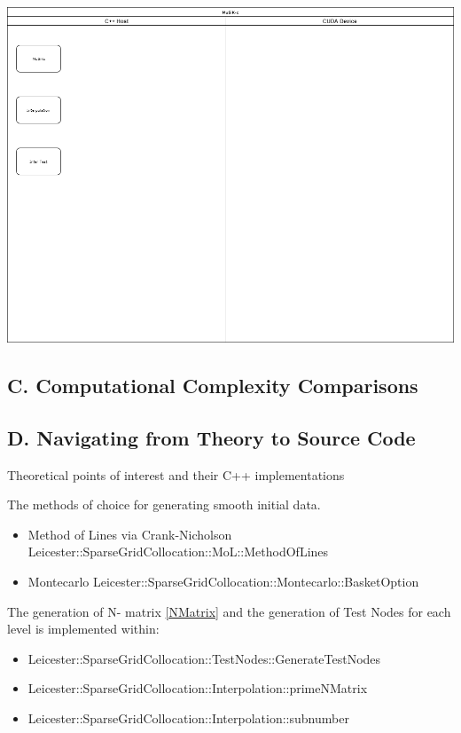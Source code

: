 \documentclass[a4paper]{amsart}
\begin{document}
\includegraphics[scale=0.3]{MuSiKc1.png}

\subsection{C. Computational Complexity Comparisons}


\subsection{D. Navigating from Theory to Source Code}
Theoretical points of interest and their C++ implementations

The methods of choice for generating smooth initial data.
\begin{itemize}
\item Method of Lines via Crank-Nicholson Leicester::SparseGridCollocation::MoL::MethodOfLines
\item Montecarlo Leicester::SparseGridCollocation::Montecarlo::BasketOption
\end{itemize}

The generation of N- matrix \ref{NMatrix} and the generation of Test Nodes for each level is implemented within:
\begin{itemize}
\item Leicester::SparseGridCollocation::TestNodes::GenerateTestNodes
\item Leicester::SparseGridCollocation::Interpolation::primeNMatrix
\item Leicester::SparseGridCollocation::Interpolation::subnumber
\end{itemize}
\end{document}
